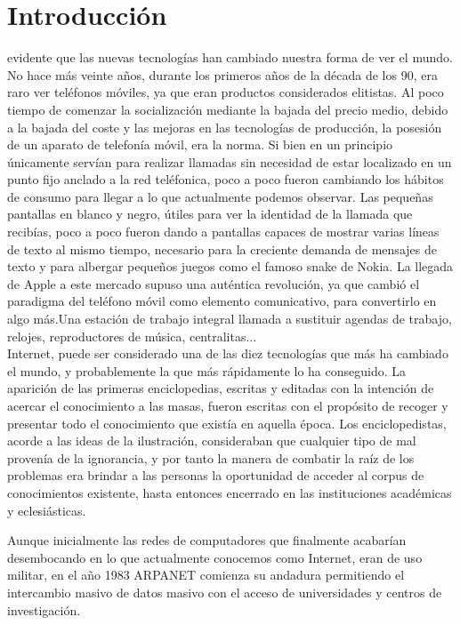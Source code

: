 \chapter{Introducción}

 evidente que las nuevas tecnologías han cambiado nuestra forma de ver el mundo. No hace más veinte años, durante los primeros años de la década de los 90, era raro ver teléfonos móviles, ya que eran productos considerados elitistas. Al poco tiempo de comenzar la socialización mediante la bajada del precio medio, debido a la bajada del coste y las mejoras en las tecnologías de producción, la posesión de un aparato de telefonía móvil, era la norma. Si bien en un principio únicamente servían para realizar llamadas sin necesidad de estar localizado en un punto fijo anclado a la red teléfonica, poco a poco fueron cambiando los hábitos de consumo para llegar a lo que actualmente podemos observar. Las pequeñas pantallas en blanco y negro, útiles para ver la identidad de la llamada que recibías, poco a poco fueron dando a pantallas capaces de mostrar varias líneas de texto al mismo tiempo, necesario para la creciente demanda de mensajes de texto y para albergar pequeños juegos como el famoso snake de Nokia. La llegada de Apple a este mercado supuso una auténtica revolución, ya que cambió el paradigma del teléfono móvil como elemento comunicativo, para convertirlo en algo más.Una estación de trabajo integral llamada a sustituir agendas de trabajo, relojes, reproductores de música, centralitas...\\


Internet, puede ser considerado una de las diez tecnologías que más ha cambiado el mundo, y probablemente la que más rápidamente lo ha conseguido. La aparición de las primeras enciclopedias, escritas y editadas con la intención de acercar el conocimiento a las masas, fueron escritas con el propósito de recoger y presentar todo el conocimiento que existía en aquella época. Los enciclopedistas, acorde a las ideas de la ilustración, consideraban que cualquier tipo de mal provenía de la ignorancia, y por tanto la manera de combatir la raíz de los problemas era brindar a las personas la oportunidad de acceder al corpus de conocimientos existente, hasta entonces encerrado en las instituciones académicas y eclesiásticas.

Aunque inicialmente las redes de computadores que finalmente acabarían desembocando en lo que actualmente conocemos como Internet, eran de uso militar, en el año 1983 ARPANET comienza su andadura permitiendo el intercambio masivo de datos masivo con el acceso de universidades y centros de investigación.%

